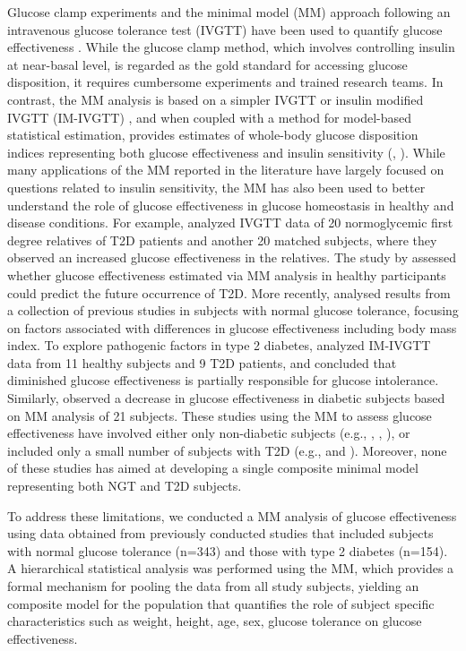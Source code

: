 \documentclass[utf8]{frontiersSCNS} %
\begin{document}
Glucose clamp experiments and the minimal model (MM) approach following an intravenous glucose tolerance test (IVGTT) have been used to quantify glucose effectiveness \citep{Dube2015}. While the glucose clamp method, which involves controlling insulin at near-basal level, is regarded as the gold standard for accessing glucose disposition, it requires cumbersome experiments and trained research teams. In contrast, the MM analysis is based on a simpler IVGTT or insulin modified IVGTT (IM-IVGTT) \citep{IM_IV_1998}, and when coupled with a method for model-based statistical estimation, provides estimates of whole-body glucose disposition indices representing both glucose effectiveness and insulin sensitivity (\citet{bergman_equ}, \citet{jan_equ}). While many applications of the MM reported in the literature have largely focused on questions related to insulin sensitivity, the MM has also been used to better understand the role of glucose effectiveness in glucose homeostasis in healthy and disease conditions. For example, \citet{jan_relative} analyzed IVGTT data of 20 normoglycemic first degree relatives of T2D patients and another 20 matched subjects, where they observed an increased glucose effectiveness in the relatives. The study by \cite{lorenzo_2010} assessed whether glucose effectiveness estimated via MM analysis in healthy participants could predict the future occurrence of T2D. More recently, \citet{Morettini_2019} analysed results from a collection of previous studies in subjects with normal glucose tolerance, focusing on factors associated with differences in glucose effectiveness including body mass index. To explore pathogenic factors in type 2 diabetes, \citet{ataru_1992} analyzed IM-IVGTT data from 11 healthy subjects and 9 T2D patients, and concluded that diminished glucose effectiveness is partially responsible for glucose intolerance. Similarly, \citet{welch_1990} observed a decrease in glucose effectiveness in diabetic subjects based on MM analysis of 21 subjects. These studies using the MM to assess glucose effectiveness have involved either only non-diabetic subjects (e.g., \citet{jan_relative}, \cite{lorenzo_2010}, \citet{Morettini_2019}), or included only a small number of subjects with T2D (e.g., \citet{ataru_1992} and \citet{welch_1990}). Moreover, none of these studies has aimed at developing a single composite minimal model representing both NGT and T2D subjects.

To address these limitations, we conducted a MM analysis of glucose effectiveness using data obtained from previously conducted studies that included subjects with normal glucose tolerance (n=343) and those with type 2 diabetes (n=154). A hierarchical statistical analysis was performed using the MM, which provides a formal mechanism for pooling the data from all study subjects, yielding an composite model for the population that quantifies the role of subject specific characteristics such as weight, height, age, sex, glucose tolerance on glucose effectiveness.
\end{document}
